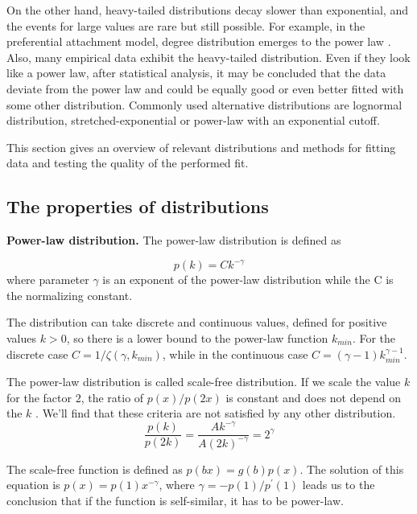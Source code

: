 On the other hand, heavy-tailed distributions decay slower than exponential, and the events for large values are rare but still possible. For example, in the preferential attachment model, degree distribution emerges to the power law \cite{barabasi2016network}. Also, many empirical data exhibit the heavy-tailed distribution. Even if they look like a power law, after statistical analysis, it may be concluded that the data deviate from the power law and could be equally good or even better fitted with some other distribution. Commonly used alternative distributions are lognormal distribution, stretched-exponential or power-law with an exponential cutoff. 

This section gives an overview of relevant distributions and methods for fitting data and testing the quality of the performed fit. 


\subsection{The properties of distributions}

\textbf{Power-law distribution.} The power-law distribution \cite{mitzenmacher2004brief, newman2005power} is defined as 

\begin{equation}
p(k) = C k^{-\gamma}
\end{equation}
where parameter $\gamma$ is an exponent of the power-law distribution while the C is the normalizing constant. 

The distribution can take discrete and continuous values, defined for positive values $k>0$, so there is a lower bound to the power-law function $k_{min}$. For the discrete case $C=1/\zeta(\gamma, k_{min})$, while in the continuous case $C=(\gamma-1)k_{min}^{\gamma-1}$. 

The power-law distribution is called scale-free distribution. If we scale the value $k$ for the factor $2$, the ratio of $p(x)/p(2x)$ is constant and does not depend on the $k$ \cite{caldarelli2007scalefree}. We'll find that these criteria are not satisfied by any other distribution. 
\begin{equation}
\frac{p(k)}{p(2k)} = \frac{Ak^{-\gamma}}{A(2k)^{-\gamma}} = 2^{\gamma}
\end{equation}

The scale-free function is defined as $p(bx) = g(b)p(x)$. The solution of this equation is $p(x)=p(1)x^{-\gamma}$, where  $\gamma=-p(1)/p^{'}(1)$ leads us to the conclusion that if the function is self-similar, it has to be power-law.

